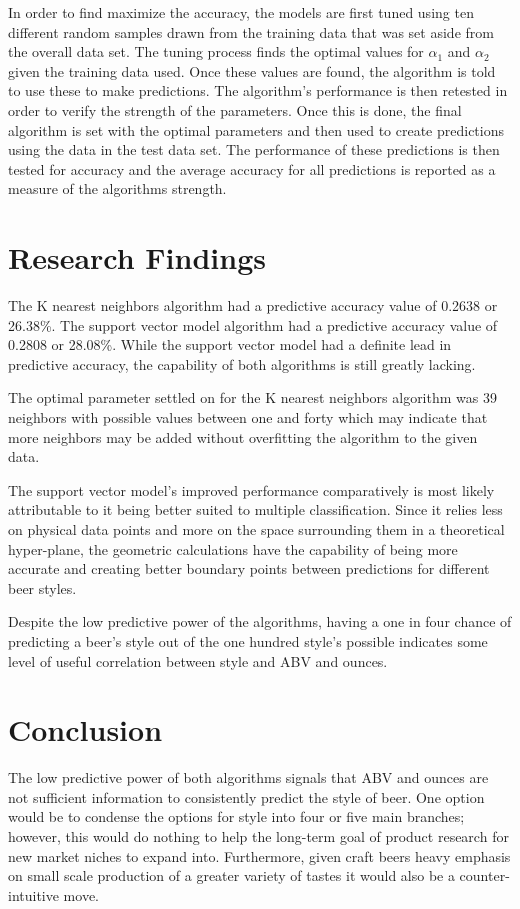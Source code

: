\documentclass[12pt,english]{article}
\begin{document}
In order to find maximize the accuracy, the models are first tuned using ten different random samples drawn from the training data that was set aside from the overall data set.  The tuning process finds the optimal values for $\alpha_{1}$ and $\alpha_{2}$ given the training data used.  Once these values are found, the algorithm is told to use these to make predictions.  The algorithm's performance is then retested in order to verify the strength of the parameters.  Once this is done, the final algorithm is set with the optimal parameters and then used to create predictions using the data in the test data set.  The performance of these predictions is then tested for accuracy and the average accuracy for all predictions is reported as a measure of the algorithms strength.


\section{Research Findings}\label{sec:results}
The K nearest neighbors algorithm had a predictive accuracy value of 0.2638 or 26.38\%.  The support vector model algorithm had a predictive accuracy value of 0.2808 or 28.08\%.  While the support vector model had a definite lead in predictive accuracy, the capability of both algorithms is still greatly lacking.

The optimal parameter settled on for the K nearest neighbors algorithm was 39 neighbors with possible values between one and forty which may indicate that more neighbors may be added without overfitting the algorithm to the given data.

The support vector model's improved performance comparatively is most likely attributable to it being better suited to multiple classification.  Since it relies less on physical data points and more on the space surrounding them in a theoretical hyper-plane, the geometric calculations have the capability of being more accurate and creating better boundary points between predictions for different beer styles.

Despite the low predictive power of the algorithms, having a one in four chance of predicting a beer's style out of the one hundred style's possible indicates some level of useful correlation between style and ABV and ounces.  


\section{Conclusion}\label{sec:conclusion}
The low predictive power of both algorithms signals that ABV and ounces are not sufficient information to consistently predict the style of beer.  One option would be to condense the options for style into four or five main branches; however, this would do nothing to help the long-term goal of product research for new market niches to expand into.  Furthermore, given craft beers heavy emphasis on small scale production of a greater variety of tastes it would also be a counter-intuitive move.
\end{document}
